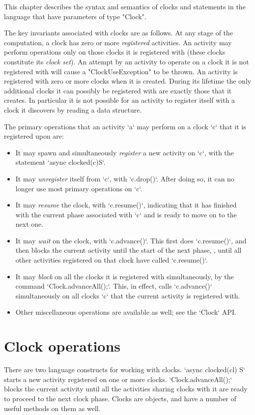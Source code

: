 This chapter describes the syntax and semantics of clocks and
statements in the language that have parameters of type \xcd"Clock". 

The key invariants associated with clocks are as follows.  At any
stage of the computation, a clock has zero or more {\em registered}
activities. An activity may perform operations only on those clocks it
is registered with (these clocks constitute its {\em clock set}). 
An attempt by an activity to operate on a clock it is not registered with
will cause a 
\xcd"ClockUseException"
to be thrown.  
An activity is registered with zero or more clocks when it is created.
During its lifetime the only additional clocks it can possibly be registered with
are exactly those that it creates. In particular it is not possible
for an activity to register itself with a clock it discovers by
reading a data structure.

The primary operations that an activity \xcd`a` may perform on a clock \xcd`c`
that it is registered upon are: 
\begin{itemize}
\item It may spawn and simultaneously  {\em register} a new activity on
      \xcd`c`, with the statement       \xcd`async clocked(c)S`.
\item It may {\em unregister} itself from \xcd`c`, with \xcd`c.drop()`.  After
      doing so, it can no longer use most primary operations on \xcd`c`.
\item It may {\em resume} the clock, with \xcd`c.resume()`, indicating that it
      has finished with the current phase associated with \xcd`c` and is ready
      to move on to the next one.
\item It may {\em wait} on the clock, with \xcd`c.advance()`.  This first does
      \xcd`c.resume()`, and then blocks the current activity until the start
      of the next phase, \viz, until all other activities registered on that
      clock have called \xcd`c.resume()`.
\item It may {\em block} on all the clocks it is registered with
      simultaneously, by the command \xcd`Clock.advanceAll();`.  This, in effect, calls
      \xcd`c.advance()` simultaneously 
      on all clocks \xcd`c` that the current activity is registered with.
\item Other miscellaneous operations are available as well; see the
      \xcd`Clock` API.
\end{itemize}


\section{Clock operations}\label{sec:clock}
There are two language constructs for working with clocks. 
\xcd`async clocked(cl) S` starts a new activity registered on one or more
clocks.  \xcd`Clock.advanceAll();` blocks the current activity until all the activities
sharing clocks with it are ready to proceed to the next clock phase. 
Clocks are objects, and have a number of useful methods on them as well.

